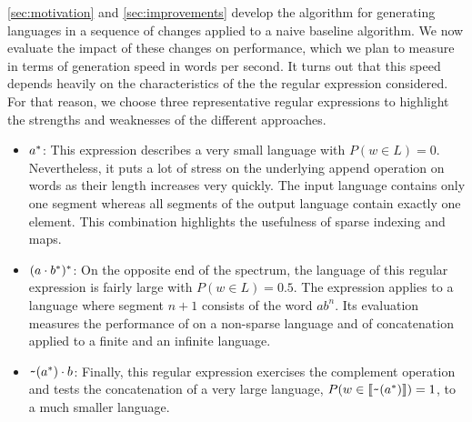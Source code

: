 \cref{sec:motivation} and \cref{sec:improvements} develop the
algorithm for generating languages in a sequence of changes applied to
a naive baseline algorithm. We now evaluate the impact of these
changes on performance, which we plan to measure in terms of
generation speed in words per second. It turns out that this speed
depends heavily on the characteristics of the the regular expression
considered. For that reason, we choose three representative regular expressions to highlight the
strengths and weaknesses of the different approaches.
\begin{itemize}
\item $a^*$: This expression describes a very small language with $P (w\in L) = 0$.
  Nevertheless, it puts a lot of stress on the underlying
  append operation on words as their length increases very quickly.
  The input language contains only one segment whereas all segments of
  the output language contain exactly one element. This combination
  highlights the usefulness of sparse indexing and maps.
\item $(a \cdot{b^*})^*$: On the opposite end of the
  spectrum, the language of this regular expression is fairly large
  with $P (w\in L)=0.5$. The expression applies  to a
  language where segment $n+1$ consists of the word $ab^n$. Its
  evaluation measures the performance of  on a non-sparse
  language and of {concatenation} applied to a finite and an infinite
  language.
\item $\texttt{\textasciitilde}{(a^*)} \cdot{b}$: Finally, this regular
  expression exercises the complement operation and tests the
  concatenation of a very large language, 
  $P (w\in \llbracket\texttt{\textasciitilde}{(a^*)}\rrbracket) = 1$, to a much smaller
  language.
\end{itemize}

